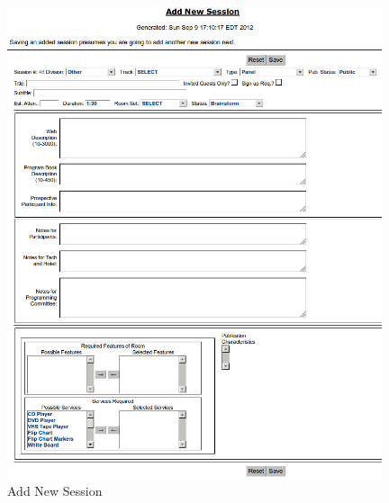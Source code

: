 \documentclass[tablesignature]{scrartcl}
\begin{document}
\begin{figure}[H]
\centering
\includegraphics[width=0.98\textwidth]{./Images/Add_New_Session.png}
\caption{\label{fig:Zambia_Presenter_Flow_Add_New_Session}Add New Session}
\end{figure}
\end{document}
